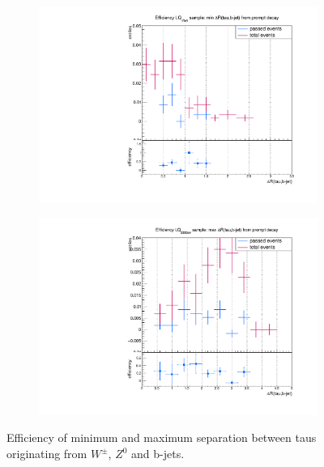 \begin{figure}
\begin{subfigure}[t]{0.49\textwidth}
                \label{dRprompt:signal:taubjet:maxLQ75}
                \end{subfigure}
                \begin{subfigure}[t]{0.49\textwidth}
                \includegraphics[width=\textwidth]{figures/plots/LQ76/Divided_mindR_pr_taubjet.pdf}
                \label{dRprompt:signal:taubjet:minLQ76}
                \end{subfigure}
                \begin{subfigure}[t]{0.49\textwidth}
                \includegraphics[width=\textwidth]{figures/plots/LQ76/Divided_maxdR_pr_taubjet.pdf}
                \label{dRprompt:signal:taubjet:maxLQ76}
                \end{subfigure}
\caption[Efficiency of separation between taus originating from $W^\pm$, $Z^0$ and b-jets.]{Efficiency of minimum and maximum separation between taus originating from $W^\pm$, $Z^0$ and b-jets.}
\label{dRprompt:signal:taubjet}
\end{figure}
